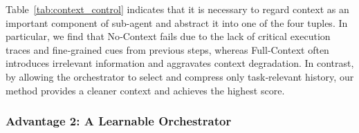 Table~\ref{tab:context_control} indicates that it is necessary to regard context as an important component of sub-agent and abstract it into one of the four tuples.
In particular, we find that No‑Context fails due to the lack of critical execution traces and fine‑grained cues from previous steps, whereas Full‑Context often introduces irrelevant information and aggravates context degradation.
In contrast, by allowing the orchestrator to select and compress only task‑relevant history, our method provides a cleaner context and achieves the highest score. 

\subsubsection{Advantage 2: A Learnable Orchestrator}
\label{sec:adv2}

\begin{table}[htbp]
\centering
\small
\setlength{\tabcolsep}{8pt}
\caption{Main results. ReAct is evaluated with a single specified LM per run, while other systems may use either a single LM or a mixed-LM pool. ICL denotes context learning.}
\label{tab:level_main}
\end{table}

